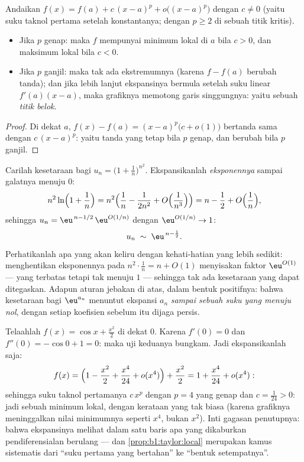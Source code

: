 \begin{proposition}\label{prop:b1:taylor:local}
Andaikan $f(x) = f(a) + c\,(x - a)^p + o\bigl((x-a)^p\bigr)$ dengan $c
\neq 0$ (yaitu suku taknol pertama setelah konstantanya; dengan $p \geq 2$ di sebuah
titik kritis).
\begin{itemize}
  \item Jika $p$ genap: maka $f$ mempunyai minimum lokal di $a$ bila $c > 0$, dan
        maksimum lokal bila $c < 0$.
  \item Jika $p$ ganjil: maka tak ada ekstremumnya (karena $f - f(a)$ berubah tanda);
        dan jika lebih lanjut ekspansinya bermula setelah suku linear $f'(a)(x
        - a)$, maka grafiknya memotong garis singgungnya: yaitu sebuah \emph{titik belok}.
\end{itemize}
\end{proposition}

\begin{proof}
Di dekat $a$, $f(x) - f(a) = (x-a)^p\bigl(c + o(1)\bigr)$ bertanda
sama dengan $c\,(x-a)^p$: yaitu tanda yang tetap bila $p$ genap, dan berubah bila $p$ ganjil.
\end{proof}

\begin{example}\label{ex:b1:taylor:expdiscipline}
Carilah kesetaraan bagi $u_n = \bigl(1 + \frac1n\bigr)^{n^2}$.
Ekspansikanlah \emph{eksponennya} sampai galatnya menuju $0$:
\[
n^2 \ln\Bigl(1 + \frac1n\Bigr)
= n^2\Bigl(\frac1n - \frac{1}{2n^2} +
O\Bigl(\frac{1}{n^3}\Bigr)\Bigr)
= n - \frac12 + O\Bigl(\frac1n\Bigr),
\]
sehingga $u_n = \eu^{\,n - 1/2}\,\eu^{O(1/n)}$ dengan $\eu^{O(1/n)} \to
1$:
\[
u_n \;\sim\; \eu^{\,n - \frac12} .
\]
Perhatikanlah apa yang akan keliru dengan kehati-hatian yang lebih sedikit: menghentikan
eksponennya pada $n^2\cdot\frac1n = n + O(1)$ menyisakan faktor
$\eu^{O(1)}$ --- yang terbatas tetapi tak menuju $1$ --- sehingga
tak ada kesetaraan yang dapat ditegaskan. Adapun aturan
jebakan di atas, dalam bentuk positifnya: bahwa kesetaraan bagi
$\eu^{a_n}$ menuntut ekspansi $a_n$ \emph{sampai sebuah suku
yang menuju nol}, dengan setiap koefisien sebelum itu dijaga
persis.
\end{example}

\begin{example}\label{ex:b1:taylor:flatmin}
Telaahlah $f(x) = \cos x + \frac{x^2}{2}$ di dekat $0$. Karena $f'(0) =
0$ dan $f''(0) = -\cos 0 + 1 = 0$: maka uji  keduanya
bungkam. Jadi ekspansikanlah saja:
\[
f(x) = \Bigl(1 - \frac{x^2}{2} + \frac{x^4}{24} +
o(x^4)\Bigr) + \frac{x^2}{2}
= 1 + \frac{x^4}{24} + o(x^4) :
\]
sehingga suku taknol pertamanya $c\,x^p$ dengan $p = 4$ yang genap dan $c =
\frac{1}{24} > 0$: jadi sebuah minimum lokal, dengan kerataan yang tak biasa (karena
grafiknya meninggalkan nilai minimumnya seperti $x^4$, bukan $x^2$). Inti
gagasan penutupnya: bahwa ekspansinya melihat dalam satu baris apa yang dikaburkan
pendiferensialan berulang --- dan \cref{prop:b1:taylor:local} merupakan
kamus sistematis dari ``suku pertama yang bertahan'' ke
``bentuk setempatnya''.
\end{example}


